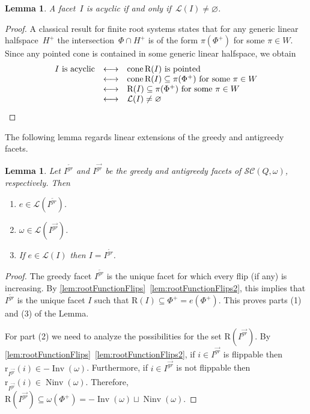 \documentclass[reqno]{amsart}
\newtheorem{lemma}[theorem]{Lemma}
\theoremstyle{definition}
\DeclareMathOperator{\cone}{cone} %
\DeclareMathOperator{\Inv}{Inv} %
\DeclareMathOperator{\Ninv}{Ninv} %
\newcommand{\linearExtensions}{\mathcal{L}} %
\newcommand{\subwordComplex}{\mathcal{SC}} %
\newcommand{\Roots}{\mathrm{R}} %
\newcommand{\rootFunction}[2]{\mathrm{r}_{#1}(#2)} %
\newcommand{\greedyFacet}{I^{\overleftarrow{gr}}} %
\newcommand{\antiGreedyFacet}{I^{\overrightarrow{gr}}} %
\begin{document}
\begin{lemma}
\label{lem:linearExtensionsAcyclic}
A facet~$I$ is acyclic if and only if~$\linearExtensions(I)\neq \varnothing$.
\end{lemma}

\begin{proof}
A classical result for finite root systems states that for any generic linear halfspace~$H^+$ the intersection~$\Phi \cap H^+$ is of the form $\pi(\Phi^+)$ for some $\pi \in W$.
Since any pointed cone is contained in some generic linear halfspace, we obtain
\[
\begin{array}[b]{rcl}
I \text{ is acyclic}  & \longleftrightarrow  &  \cone \Roots(I) \text{ is pointed} \\
& \longleftrightarrow  & \cone \Roots(I)\subseteq \pi(\Phi^+) \text{ for some } \pi\in W \\
& \longleftrightarrow  &  \Roots(I)\subseteq \pi(\Phi^+) \text{ for some } \pi\in W \\
& \longleftrightarrow  &  \linearExtensions(I) \neq \varnothing 
\end{array}
\qedhere
\]
\end{proof}

The following lemma regards linear extensions of the greedy and antigreedy facets.

\begin{lemma}
\label{lem:linearExtensionsGreedyFacets}
Let $\greedyFacet$ and $\antiGreedyFacet$ be the greedy and antigreedy facets of $\subwordComplex(Q,\omega)$, respectively.
Then 
\begin{enumerate}
\item $e\in \linearExtensions(\greedyFacet)$.
\item $\omega \in \linearExtensions(\antiGreedyFacet)$.
\item If $e\in \linearExtensions(I)$ then $I=\greedyFacet$.
\end{enumerate}
\end{lemma}

\begin{proof}
The greedy facet $\greedyFacet$ is the unique facet for which every flip (if any) is increasing.
By \cref{lem:rootFunctionFlips}~\eqref{lem:rootFunctionFlips2}, this implies that $\greedyFacet$ is the unique facet $I$ such that $\Roots(I)\subseteq \Phi^+ = e(\Phi^+)$.
This proves parts (1) and (3) of the Lemma.   
    
For part (2) we need to analyze the possibilities for the set $\Roots(\antiGreedyFacet)$.
By \cref{lem:rootFunctionFlips}~\eqref{lem:rootFunctionFlips2}, if $i\in \antiGreedyFacet$ is flippable then $\rootFunction{\antiGreedyFacet}{i}\in -\Inv(\omega)$.
Furthermore, if $i\in \antiGreedyFacet$ is not flippable then $\rootFunction{\antiGreedyFacet}{i}\in \Ninv(\omega)$.
Therefore, $\Roots(\antiGreedyFacet)\subseteq \omega(\Phi^+)=-\Inv(\omega)\sqcup \Ninv(\omega)$.
\end{proof}
\end{document}
